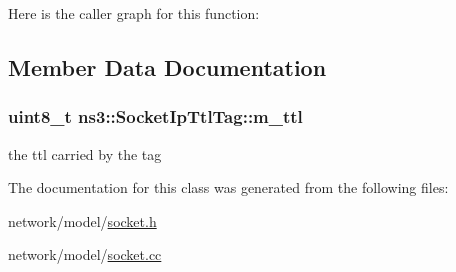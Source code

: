 Here is the caller graph for this function\+:




\subsection{Member Data Documentation}
\subsubsection[{\texorpdfstring{m\+\_\+ttl}{m_ttl}}]{\setlength{\rightskip}{0pt plus 5cm}uint8\+\_\+t ns3\+::\+Socket\+Ip\+Ttl\+Tag\+::m\+\_\+ttl\hspace{0.3cm}{\ttfamily [private]}}\hypertarget{classns3_1_1SocketIpTtlTag_ab0a6079475cdd067233c275ab820c341}{}\label{classns3_1_1SocketIpTtlTag_ab0a6079475cdd067233c275ab820c341}


the ttl carried by the tag 



The documentation for this class was generated from the following files\+:\begin{DoxyCompactItemize}
\item 
network/model/\hyperlink{socket_8h}{socket.\+h}\item 
network/model/\hyperlink{socket_8cc}{socket.\+cc}\end{DoxyCompactItemize}
